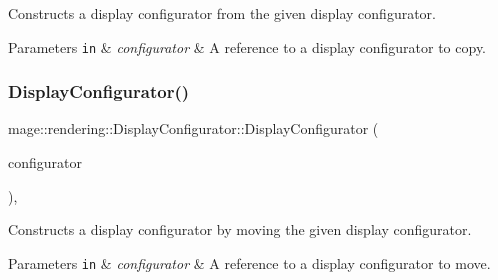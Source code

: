 Constructs a display configurator from the given display configurator.


\begin{DoxyParams}[1]{Parameters}
\mbox{\tt in}  & {\em configurator} & A reference to a display configurator to copy. \\
\hline
\end{DoxyParams}
\mbox{\label{classmage_1_1rendering_1_1_display_configurator_ac75dae1c4df34dda067f1a5d99fdfefa}} 
\subsubsection{\texorpdfstring{Display\+Configurator()}{DisplayConfigurator()}\hspace{0.1cm}{\footnotesize\ttfamily [4/4]}}
{\footnotesize\ttfamily mage\+::rendering\+::\+Display\+Configurator\+::\+Display\+Configurator (\begin{DoxyParamCaption}\item[{\mbox{\hyperlink{classmage_1_1rendering_1_1_display_configurator}{Display\+Configurator}} \&\&}]{configurator }\end{DoxyParamCaption})\hspace{0.3cm}{\ttfamily [default]}, {\ttfamily [noexcept]}}

Constructs a display configurator by moving the given display configurator.


\begin{DoxyParams}[1]{Parameters}
\mbox{\tt in}  & {\em configurator} & A reference to a display configurator to move. \\
\hline
\end{DoxyParams}
\mbox{\label{classmage_1_1rendering_1_1_display_configurator_a5ccba8cd97da75a7d1c425731fb848d4}} 
